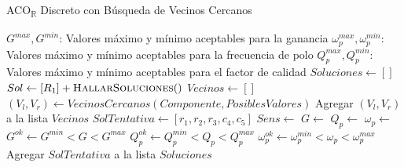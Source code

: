 \documentclass{llncs}
\begin{document}
	\begin{algorithm}[H]
		\caption{ACO\textsubscript{$\mathbb{R}$} Discreto con Búsqueda de Vecinos Cercanos}
		\label{alg:discretoFijo}
		\begin{algorithmic}[1]
			\State $G^{max}, G^{min}$: Valores máximo y mínimo aceptables para la ganancia
			\State $\omega_p^{max}, \omega_p^{min}$: Valores máximo y mínimo aceptables para la frecuencia de polo
			\State $Q_p^{max}, Q_p^{min}$: Valores máximo y mínimo aceptables para el factor de calidad
			\State $Soluciones \gets []$
				\State $Sol \gets [R_1] +  \Call{HallarSoluciones}{}()$ 
				\State $Vecinos \gets []$
				 
					\State $(V_l, V_r) \gets VecinosCercanos(Componente, PosiblesValores)$
					\State Agregar $(V_l, V_r)$ a la lista $Vecinos$
				\EndFor
				\State $SolTentativa \gets  [r_1, r_2, r_3, c_4, c_5]$
				\State $Sens \gets $ 
				\State $G \gets $ 
				\State $Q_p \gets $ 
				\State $\omega_p \gets $ 
				\State $G^{ok} \gets G^{min} < G < G^{max}$
				\State $Q_p^{ok} \gets Q_p^{min} < Q_p < Q_p^{max}$
				\State $\omega_p^{ok} \gets \omega_p^{min} < \omega_p < \omega_p^{max}$
					\State Agregar $SolTentativa$ a la lista $Soluciones$
				\EndIf
				\EndFor
				\EndFor
				\EndFor
				\EndFor
				\EndFor
			\EndFor
		\end{algorithmic}
	\end{algorithm}
		
\end{document}
